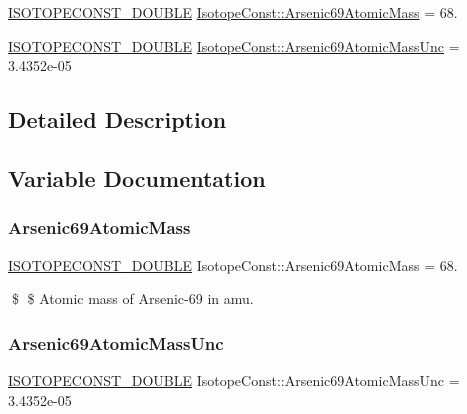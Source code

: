 \begin{DoxyCompactItemize}
\item 
\mbox{\hyperlink{group___isotope_const-_macros_ga8f45a7272ce02c0b4c65c44636ed719a}{I\+S\+O\+T\+O\+P\+E\+C\+O\+N\+S\+T\+\_\+\+D\+O\+U\+B\+LE}} \mbox{\hyperlink{group___isotope_const-_arsenic-_as69_gae336b4f9e4480cb4c1d9c571e536e9d2}{Isotope\+Const\+::\+Arsenic69\+Atomic\+Mass}} = 68.
\item 
\mbox{\hyperlink{group___isotope_const-_macros_ga8f45a7272ce02c0b4c65c44636ed719a}{I\+S\+O\+T\+O\+P\+E\+C\+O\+N\+S\+T\+\_\+\+D\+O\+U\+B\+LE}} \mbox{\hyperlink{group___isotope_const-_arsenic-_as69_gaa7783e41a65726d02bace45b9e42d608}{Isotope\+Const\+::\+Arsenic69\+Atomic\+Mass\+Unc}} = 3.\+4352e-\/05
\end{DoxyCompactItemize}


\subsection{Detailed Description}


\subsection{Variable Documentation}
\mbox{\label{group___isotope_const-_arsenic-_as69_gae336b4f9e4480cb4c1d9c571e536e9d2}} 
\subsubsection{\texorpdfstring{Arsenic69\+Atomic\+Mass}{Arsenic69AtomicMass}}
{\footnotesize\ttfamily \mbox{\hyperlink{group___isotope_const-_macros_ga8f45a7272ce02c0b4c65c44636ed719a}{I\+S\+O\+T\+O\+P\+E\+C\+O\+N\+S\+T\+\_\+\+D\+O\+U\+B\+LE}} Isotope\+Const\+::\+Arsenic69\+Atomic\+Mass = 68.}

\$ \$ Atomic mass of Arsenic-\/69 in amu. \mbox{\label{group___isotope_const-_arsenic-_as69_gaa7783e41a65726d02bace45b9e42d608}} 
\subsubsection{\texorpdfstring{Arsenic69\+Atomic\+Mass\+Unc}{Arsenic69AtomicMassUnc}}
{\footnotesize\ttfamily \mbox{\hyperlink{group___isotope_const-_macros_ga8f45a7272ce02c0b4c65c44636ed719a}{I\+S\+O\+T\+O\+P\+E\+C\+O\+N\+S\+T\+\_\+\+D\+O\+U\+B\+LE}} Isotope\+Const\+::\+Arsenic69\+Atomic\+Mass\+Unc = 3.\+4352e-\/05}

